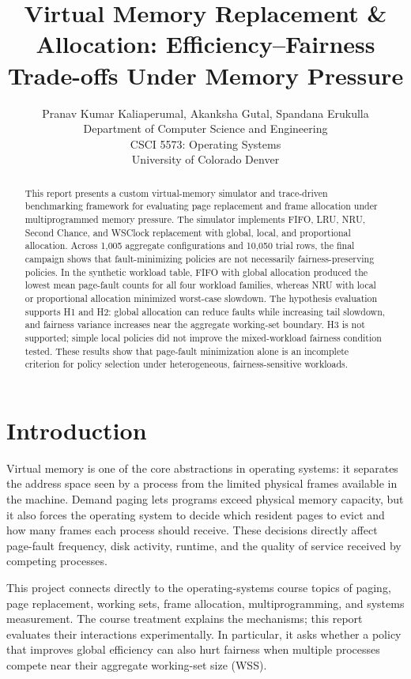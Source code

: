 \documentclass[conference]{IEEEtran}
\title{Virtual Memory Replacement \& Allocation: Efficiency--Fairness Trade-offs Under Memory Pressure}
\author{%
  Pranav Kumar Kaliaperumal, Akanksha Gutal, Spandana Erukulla\\
  Department of Computer Science and Engineering\\
  CSCI 5573: Operating Systems\\
  University of Colorado Denver\\
}
\begin{document}
\maketitle

\begin{abstract}
This report presents a custom virtual-memory simulator and trace-driven benchmarking framework for evaluating page replacement and frame allocation under multiprogrammed memory pressure. The simulator implements FIFO, LRU, NRU, Second Chance, and WSClock replacement with global, local, and proportional allocation. Across 1,005 aggregate configurations and 10,050 trial rows, the final campaign shows that fault-minimizing policies are not necessarily fairness-preserving policies. In the synthetic workload table, FIFO with global allocation produced the lowest mean page-fault counts for all four workload families, whereas NRU with local or proportional allocation minimized worst-case slowdown. The hypothesis evaluation supports H1 and H2: global allocation can reduce faults while increasing tail slowdown, and fairness variance increases near the aggregate working-set boundary. H3 is not supported; simple local policies did not improve the mixed-workload fairness condition tested. These results show that page-fault minimization alone is an incomplete criterion for policy selection under heterogeneous, fairness-sensitive workloads.
\end{abstract}

\section{Introduction}
Virtual memory is one of the core abstractions in operating systems: it separates the address space seen by a process from the limited physical frames available in the machine. Demand paging lets programs exceed physical memory capacity, but it also forces the operating system to decide which resident pages to evict and how many frames each process should receive. These decisions directly affect page-fault frequency, disk activity, runtime, and the quality of service received by competing processes.

This project connects directly to the operating-systems course topics of paging, page replacement, working sets, frame allocation, multiprogramming, and systems measurement. The course treatment explains the mechanisms; this report evaluates their interactions experimentally. In particular, it asks whether a policy that improves global efficiency can also hurt fairness when multiple processes compete near their aggregate working-set size (WSS).
\end{document}
